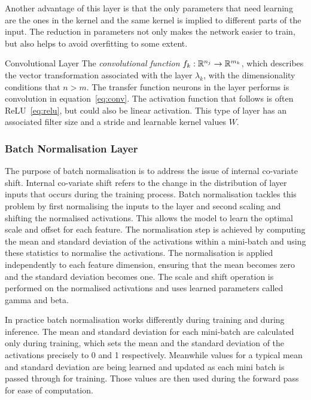 Another advantage of this layer is that the only parameters that need learning are the ones in the kernel and the same kernel is implied to different parts of the input. The reduction in parameters not only makes the network easier to train, but also helps to avoid overfitting to some extent.

\begin{Definition}{Convolutional Layer}{}
The \emph{convolutional function} $f_k:\mathbb{R}^{n_j}\to \mathbb{R}^{m_k}$, which describes the vector transformation associated with the layer $\lambda_k$, with the dimensionality conditions that $n > m$. The transfer function neurons in the layer performs is convolution in equation~\ref{eq:conv}. The activation function that follows is often ReLU~\eqref{eq:relu}, but could also be linear activation. This type of layer has an associated filter size and a stride and learnable kernel values $W$. 
\end{Definition}

\subsubsection{Batch Normalisation Layer}
\label{section:bn}
The purpose of batch normalisation is to address the issue of internal co-variate shift. Internal co-variate shift refers to the change in the distribution of layer inputs that occurs during the training process. Batch normalisation tackles this problem by first normalising the inputs to the layer and second scaling and shifting the normalised activations. This allows the model to learn the optimal scale and offset for each feature. The normalisation step is achieved by computing the mean and standard deviation of the activations within a mini-batch and using these statistics to normalise the activations. The normalisation is applied independently to each feature dimension, ensuring that the mean becomes zero and the standard deviation becomes one. The scale and shift operation is performed on the normalised activations and uses learned parameters called gamma and beta. 

In practice batch normalisation works differently during training and during inference. The mean and standard deviation for each mini-batch are calculated only during training, which sets the mean and the standard deviation of the activations precisely to 0 and 1 respectively. Meanwhile values for a typical mean and standard deviation are being learned and updated as each mini batch is passed through for training. Those values are then used during the forward pass for ease of computation.

